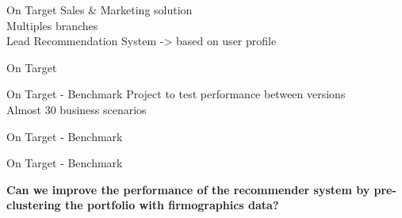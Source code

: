 \begin{frame}{On Target} \pause
    Sales \& Marketing solution\\  \pause
    \vspace{0.5cm}
    Multiples branches \\  \pause
    \vspace{0.5cm}
    Lead Recommendation System \pause
    -> based on user profile
    \vspace{0.5cm}
\end{frame}


\begin{frame}{On Target}
\end{frame}


\begin{frame}{On Target - Benchmark} \pause
    \vspace{0.5cm}
    Project to test performance between versions \\ \pause
    \vspace{0.5cm}
    Almost 30 business scenarios
\end{frame}

%

\begin{frame}{On Target - Benchmark}
\end{frame}


\begin{frame}{On Target - Benchmark}
\end{frame}


\begin{frame}{}
    \begin{center}
        \huge{\textbf{Can we improve the performance of the recommender system by pre-clustering the portfolio \pause
        with firmographics data?}}
    \end{center}
\end{frame}



